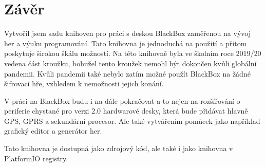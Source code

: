 \chapter{Závěr}

Vytvořil jsem sadu knihoven pro práci s deskou BlackBox zaměřenou na vývoj her a výuku programování.
Tato knihovna je jednoduchá na použití a přitom poskytuje širokou škálu možností.
Na této knihovně byla ve školním roce 2019/20 vedena část kroužku, bohužel tento kroužek nemohl být dokončen kvůli globální pandemii.
Kvůli pandemii také nebylo zatím možné použít BlackBox na žádné šifrovací hře, vzhledem k nemožnosti jejich konání.

V práci na BlackBox budu i na dále pokračovat a to nejen na rozšířování o periferie chystané pro verzi 2.0 hardwarové desky, která bude přidávat hlavně GPS, GPRS a sekundární procesor.
Ale také vytvářením pomůcek jako například grafický editor a generátor her.

Tato knihovna je dostupná jako zdrojový kód\cite{BlackBox-software}, ale také i jako knihovna v PlatformIO registry\cite{pio-registry}.